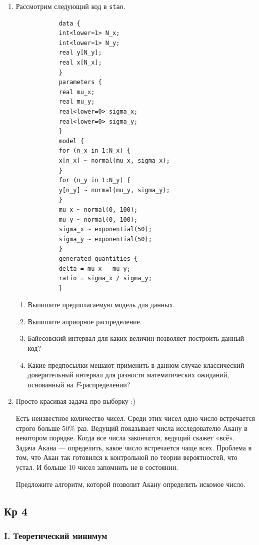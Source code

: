 \documentclass[12pt, a4paper]{article}\usepackage[]{graphicx}\usepackage[]{color}
\begin{document}
\begin{enumerate}
			\newpage
			\item Рассмотрим следующий код в \verb|stan|.

			\begin{verbatim}
			data {
			int<lower=1> N_x;
			int<lower=1> N_y;
			real y[N_y];
			real x[N_x];
			}
			parameters {
			real mu_x;
			real mu_y;
			real<lower=0> sigma_x;
			real<lower=0> sigma_y;
			}
			model {
			for (n_x in 1:N_x) {
			x[n_x] ~ normal(mu_x, sigma_x);
			}
			for (n_y in 1:N_y) {
			y[n_y] ~ normal(mu_y, sigma_y);
			}
			mu_x ~ normal(0, 100);
			mu_y ~ normal(0, 100);
			sigma_x ~ exponential(50);
			sigma_y ~ exponential(50);
			}
			generated quantities {
			delta = mu_x - mu_y;
			ratio = sigma_x / sigma_y;
			}
			\end{verbatim}

			\begin{enumerate}
				\item Выпишите предполагаемую модель для данных.
				\item Выпишите априорное распределение.
				\item Байесовский интервал для каких величин позволяет построить данный код?
				\item Какие предпосылки мешают применить в данном случае классический доверительный интервал для разности математических ожиданий, основанный на $F$-распределении?
			\end{enumerate}

			\item Просто красивая задача про выборку :)

			Есть неизвестное количество чисел. Среди этих чисел одно число встречается строго больше 50\% раз. Ведущий показывает числа исследователю Акану в некотором порядке. Когда все числа закончатся, ведущий скажет «всё». Задача Акана — определить, какое число встречается чаще всех. Проблема в том, что Акан так готовился к контрольной по теории вероятностей, что устал. И больше 10 чисел запомнить не в состоянии.

			Предложите алгоритм, которой позволит Акану определить искомое число.

		\end{enumerate}




		\subsection{Кр 4}


		\subsubsection*{I. Теоретический минимум}
\end{document}
